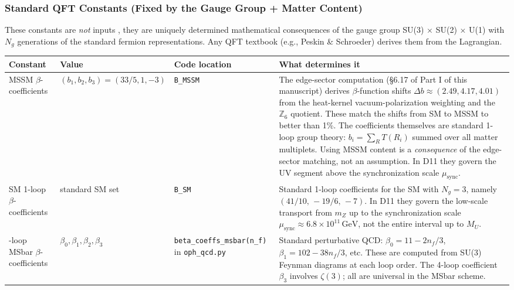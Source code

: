 \subsubsection{Standard QFT Constants (Fixed by the Gauge Group + Matter Content)}\label{1a3-standard-qft-constants-fixed-by-the-gauge-group--matter-content}

These constants are \emph{not} inputs , they are uniquely determined mathematical consequences of the gauge group SU(3) \(\times\) SU(2) \(\times\) U(1) with \(N_g\) generations of the standard fermion representations. Any QFT textbook (e.g., Peskin \& Schroeder) derives them from the Lagrangian.

{\def\LTcaptype{none} %
\setlength{\LTleft}{0pt}
\setlength{\LTright}{0pt}
\setlength{\tabcolsep}{1.2pt}
\renewcommand{\arraystretch}{1.05}
\footnotesize
\begin{longtable}[]{@{}>{\RaggedRight\arraybackslash}p{}>{\RaggedRight\arraybackslash}p{}>{\RaggedRight\arraybackslash}p{}>{\RaggedRight\arraybackslash}p{}@{}}
\toprule\noalign{}
Constant & Value & Code location & What determines it \\
\midrule\noalign{}
\endhead
\bottomrule\noalign{}
\endlastfoot
MSSM \(\beta\)-coefficients & \((b_1, b_2, b_3) = (33/5, 1, -3)\) & \texttt{B\_MSSM} & The edge-sector computation (\S{}6.17 of Part I of this manuscript) derives \(\beta\)-function shifts \(\Delta b \approx (2.49, 4.17, 4.01)\) from the heat-kernel vacuum-polarization weighting and the \(\mathbb{Z}_6\) quotient. These match the shifts from SM to MSSM to better than 1\%. The coefficients themselves are standard 1-loop group theory: \(b_i = \sum_R T(R_i)\) summed over all matter multiplets. Using MSSM content is a \emph{consequence} of the edge-sector matching, not an assumption. In D11 they govern the UV segment above the synchronization scale \(\mu_{\mathrm{sync}}\). \\
SM 1-loop \(\beta\)-coefficients & standard SM set & \texttt{B\_SM} & Standard 1-loop coefficients for the SM with \(N_g = 3\), namely \((41/10,\,-19/6,\,-7)\). In D11 they govern the low-scale transport from \(m_Z\) up to the synchronization scale \(\mu_{\mathrm{sync}}\approx 6.8\times 10^{11}\,\mathrm{GeV}\), not the entire interval up to \(M_U\). \\
4-loop MSbar \(\beta\)-coefficients & \(\beta_0, \beta_1, \beta_2, \beta_3\) & \texttt{beta\_\allowbreak coeffs\_\allowbreak msbar(n\_\allowbreak f)} in \texttt{oph\_\allowbreak qcd.py} & Standard perturbative QCD: \(\beta_0 = 11 - 2n_f/3\), \(\beta_1 = 102 - 38n_f/3\), etc. These are computed from SU(3) Feynman diagrams at each loop order. The 4-loop coefficient \(\beta_3\) involves \(\zeta(3)\); all are universal in the MSbar scheme. \\

\end{longtable}}
